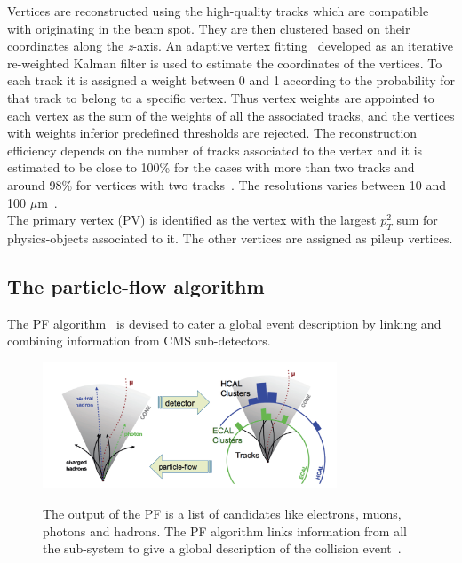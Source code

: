 Vertices are reconstructed using the high-quality tracks which are
compatible with originating in the beam spot. They are then clustered
based on their coordinates along the \emph{z}-axis. An adaptive vertex
fitting~\cite{Waltenberger_2007} developed as an iterative re-weighted Kalman filter
is used to estimate the coordinates of the vertices. To each track it is assigned a
weight between 0 and 1 according to the probability for that track to
belong to a specific vertex. Thus vertex weights are appointed to each
vertex as the sum of the weights of all the
associated tracks, and the vertices with weights inferior predefined
thresholds are rejected. The reconstruction efficiency depends on the
number of tracks associated to the vertex and it is estimated to
be close to 100\% for the cases with more than two tracks and around
98\% for vertices with two tracks~\cite{CMS:particleflow}. The
resolutions varies between 10 and 100 $\mu$m~\cite{CMS:particleflow}.\\
The primary vertex (PV) is identified as the vertex with the largest $p^2_T$ sum for
physics-objects associated to it. The other vertices are assigned as pileup
vertices.

\subsection{The particle-flow algorithm}\label{sec:PF}

The PF algorithm~\cite{CMS:particleflow} is devised to cater a global event
description by linking and combining information from CMS
sub-detectors. 
\begin{figure}[h]
\centering
\includegraphics[width=0.78\textwidth]{Figures/c2/pfscheme}\\
\caption{The output of the PF is a list of candidates like
  electrons, muons, photons and hadrons. The PF algorithm links
  information from all the sub-system to give a global description of
  the collision event~\cite{Petrucciani:2650974}.}
\label{fig:pfscheme}
\end{figure} 

